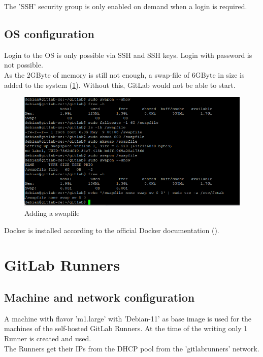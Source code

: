 The 'SSH' security group is only enabled on demand when a login is required.

\subsection{OS configuration}

Login to the OS is only possible via SSH and SSH keys. Login with password is not possible.\\

As the 2GByte of memory is still not enough, a swap-file of 6GByte in size is added to the system (\ref{fig:swapfile}).
Without this, GitLab would not be able to start.

\begin{figure}[H]
	\centering
	\includegraphics[width=14cm]{images/swapfile.png}
	\caption{Adding a swapfile}
	\label{fig:swapfile}
\end{figure}

Docker is installed according to the official Docker documentation (\cite{refDockerDebian}).

\section{GitLab Runners}

\subsection{Machine and network configuration}

A machine with flavor 'm1.large' with 'Debian-11' as base image is used for the machines of the self-hosted GitLab Runners.
At the time of the writing only 1 Runner is created and used.\\

The Runners get their IPs from the DHCP pool from the 'gitlabrunners' network.\\

